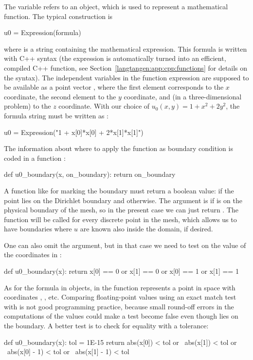 The  variable refers to an  object, which
is used to represent a mathematical function. The typical construction is
\begin{python}
u0 = Expression(formula)
\end{python}
where  is a string containing the mathematical expression.
This formula is
written with C++ syntax (the expression is
automatically turned into an efficient, compiled
C++ function, see Section~\ref{langtangen:app:cpp:functions} for
details on the syntax). The independent variables in the function
expression are supposed to be available
as a point vector , where the first element 
corresponds to the $x$ coordinate, the second element 
to the $y$ coordinate, and (in a three-dimensional problem)
 to the $z$ coordinate. With our choice of
$u_0(x,y)=1 + x^2 + 2y^2$, the formula string must be written
as :
\begin{python}
u0 = Expression("1 + x[0]*x[0] + 2*x[1]*x[1]")
\end{python}

The information about where to apply the  function as
boundary condition is coded in a function :
\begin{python}
def u0_boundary(x, on_boundary):
    return on_boundary
\end{python}
A function like  for marking the boundary must
return
a boolean value:  if the point
 lies on the Dirichlet boundary and
 otherwise.
The argument  is  if  is on
the physical boundary of the mesh, so in the present case we can just return
.
The  function will be called
for every discrete point in the mesh, which allows us to have boundaries
where $u$ are known also inside the domain, if desired.

One can also omit the  argument,
but in that case we need to test on the value of the coordinates
in :
\begin{python}
def u0_boundary(x):
    return x[0] == 0 or x[1] == 0 or x[0] == 1 or x[1] == 1
\end{python}
As for the formula in  objects,  in the
 function represents a point in space with
coordinates , , etc. Comparing floating-point
values using an exact match test with \emp{==}
is not good programming practice, because small round-off errors in
the computations of the  values could make a test
 become false even though  lies on the boundary.
A better test is to check for equality with a tolerance:
\begin{python}
def u0_boundary(x):
    tol = 1E-15
    return abs(x[0]) < tol or \
           abs(x[1]) < tol or \
           abs(x[0] - 1) < tol or \
           abs(x[1] - 1) < tol
\end{python}


